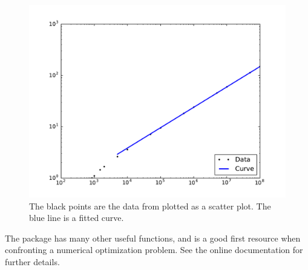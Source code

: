 \begin{figure}
\includegraphics[width=\textwidth]{ConvectionFit.pdf}
\caption{The black points are the data from  plotted as a scatter plot. The blue line is a fitted curve.}
\label{opt:ConvectionFit}
\end{figure}

The  package has many other useful functions, and is a good first resource when confronting a numerical optimization problem. 
See the online documentation for further details.
